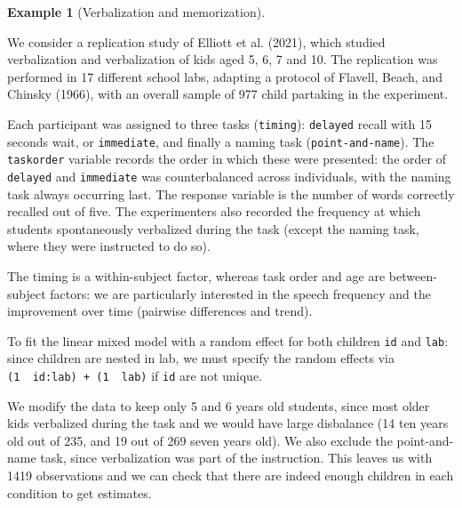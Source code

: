 \documentclass[
  11pt,
  letterpaper,
]{scrbook}
\theoremstyle{definition}
\theoremstyle{definition}
\newtheorem{example}{Example}[chapter]
\theoremstyle{remark}
\begin{document}
\begin{example}[Verbalization and
memorization]\protect\hypertarget{exm-verbalization-memorization}{}\label{exm-verbalization-memorization}

We consider a replication study of Elliott et al. (2021), which studied
verbalization and verbalization of kids aged 5, 6, 7 and 10. The
replication was performed in 17 different school labs, adapting a
protocol of Flavell, Beach, and Chinsky (1966), with an overall sample
of 977 child partaking in the experiment.

Each participant was assigned to three tasks (\texttt{timing}):
\texttt{delayed} recall with 15 seconds wait, or \texttt{immediate}, and
finally a naming task (\texttt{point-and-name}). The \texttt{taskorder}
variable records the order in which these were presented: the order of
\texttt{delayed} and \texttt{immediate} was counterbalanced across
individuals, with the naming task always occurring last. The response
variable is the number of words correctly recalled out of five. The
experimenters also recorded the frequency at which students
spontaneously verbalized during the task (except the naming task, where
they were instructed to do so).

The timing is a within-subject factor, whereas task order and age are
between-subject factors: we are particularly interested in the speech
frequency and the improvement over time (pairwise differences and
trend).

To fit the linear mixed model with a random effect for both children
\texttt{id} and \texttt{lab}: since children are nested in lab, we must
specify the random effects via
\texttt{(1\ \textbar{}\ id:lab)\ +\ (1\ \textbar{}\ lab)} if \texttt{id}
are not unique.

We modify the data to keep only 5 and 6 years old students, since most
older kids verbalized during the task and we would have large disbalance
(14 ten years old out of 235, and 19 out of 269 seven years old). We
also exclude the point-and-name task, since verbalization was part of
the instruction. This leaves us with 1419 observations and we can check
that there are indeed enough children in each condition to get
estimates.


\end{example}
\end{document}
